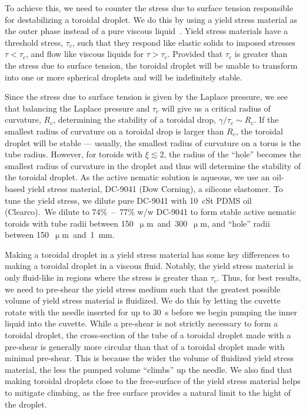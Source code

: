 To achieve this, we need to counter the stress due to surface tension responsible for destabilizing a toroidal droplet.
We do this by using a yield stress material as the outer phase instead of a pure viscous liquid~\cite{RN47,RN258}.
Yield stress materials have a threshold stress, $\tau_c$, such that they respond like elastic solids to imposed stresses $\tau < \tau_c$, and flow like viscous liquids for $\tau > \tau_c$.
Provided that $\tau_c$ is greater than the stress due to surface tension, the toroidal droplet will be unable to transform into one or more spherical droplets and will be indefinitely stable.

Since the stress due to surface tension is given by the Laplace pressure, we see that balancing the Laplace pressure and $\tau_c$ will give us a critical radius of curvature, $R_c$, determining the stability of a toroidal drop, $\gamma/\tau_c \sim R_c$.
If the smallest radius of curvature on a toroidal drop is larger than $R_c$, the toroidal droplet will be stable --- usually, the smallest radius of curvature on a torus is the tube radius.
However, for toroids with $\xi \lesssim 2$, the radius of the ``hole'' becomes the smallest radius of curvature in the droplet and thus will determine the stability of the toroidal droplet.
As the active nematic solution is aqueous, we use an oil-based yield stress material, DC-9041 (Dow Corning), a silicone elastomer.
To tune the yield stress, we dilute pure DC-9041 with 10~cSt PDMS oil (Clearco).\
We dilute to 74\%~--~77\% w/w DC-9041 to form stable active nematic toroids with tube radii between 150~$\upmu$m~and~300~$\upmu$m, and ``hole'' radii between 150~$\upmu$m~and~1~mm.

Making a toroidal droplet in a yield stress material has some key differences to making a toroidal droplet in a viscous fluid.
Notably, the yield stress material is only fluid-like in regions where the stress is greater than $\tau_c$.
Thus, for best results, we need to pre-shear the yield stress medium such that the greatest possible volume of yield stress material is fluidized.
We do this by letting the cuvette rotate with the needle inserted for up to 30~s before we begin pumping the inner liquid into the cuvette.
While a pre-shear is not strictly necessary to form a toroidal droplet, the cross-section of the tube of a toroidal droplet made with a pre-shear is generally more circular than that of a toroidal droplet made with minimal pre-shear.
This is because the wider the volume of fluidized yield stress material, the less the pumped volume ``climbs'' up the needle.
We also find that making toroidal droplets close to the free-surface of the yield stress material helps to mitigate climbing, as the free surface provides a natural limit to the hight of the droplet.

